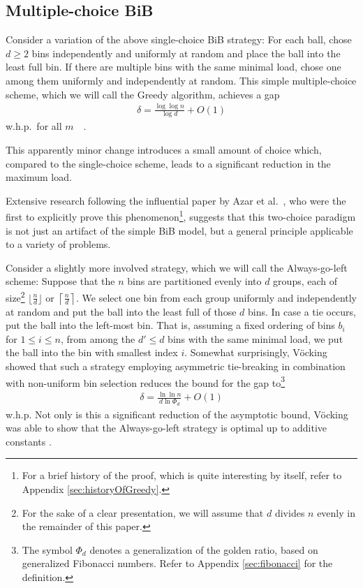 \documentclass[a4paper,12pt]{article}
\begin{document}
\subsection{Multiple-choice BiB}
Consider a variation of the above single-choice BiB strategy: For each ball, chose $d \geq 2$ bins independently and uniformly at random and place the ball into the least full bin. If there are multiple bins with the same minimal load, chose one among them uniformly and independently at random. This simple multiple-choice scheme, which we will call the Greedy algorithm, achieves a gap
\begin{align*}
\delta = \frac{\log \log n}{\log d} + O(1)
\end{align*}
 w.h.p.~for all $m$~\cite{ABKU99}~\cite{BCSV06}.
 
This apparently minor change introduces a small amount of choice which, compared to the single-choice scheme, leads to a significant reduction in the maximum load. 
\begin{comment}
Curiously, the exponential decrease in the gap is already achieved having just two choices (that is, $d=2$). Each additional choice decreases the bound for the maximum gap by just a constant factor~\cite{MRS01}. 
\end{comment}
Extensive research following the influential paper by Azar et al.~\cite{ABKU99}, who were the first to explicitly prove this phenomenon\footnote{For a brief history of the proof, which is quite interesting by itself, refer to Appendix \ref{sec:historyOfGreedy}.}, suggests that this two-choice paradigm is not just an artifact of the simple BiB model, but a general principle applicable to a variety of problems. 

Consider a slightly more involved strategy, which we will call the Always-go-left scheme: Suppose that the $n$ bins are partitioned evenly into $d$ groups, each of size\footnote{For the sake of a clear presentation, we will assume that $d$ divides $n$ evenly in the remainder of this paper.} $\lfloor \frac{n}{d}\rfloor$ or $\left\lceil\frac{n}{d}\right\rceil$. We select one bin from each group uniformly and independently at random and put the ball into the least full of those $d$ bins. In case a tie occurs, put the ball into the left-most bin. That is, assuming a fixed ordering of bins $b_i$ for $1 \leq i \leq n$, from among the $d' \leq d$ bins with the same minimal load, we put the ball into the bin with smallest index $i$. Somewhat surprisingly, V\"ocking \cite{VOC03} showed that such a strategy employing asymmetric tie-breaking in combination with non-uniform bin selection reduces the bound for the gap to\footnote{The symbol $\Phi_d$ denotes a generalization of the golden ratio, based on generalized Fibonacci numbers. Refer to Appendix \ref{sec:fibonacci} for the definition.}
\begin{align*}
\delta = \frac{\ln\ln n}{d  \ln \Phi_d} + O(1)
\end{align*}
w.h.p. Not only is this a significant reduction of the asymptotic bound, V\"ocking was able to show that the Always-go-left strategy is optimal up to additive constants \cite{VOC03}.
\end{document}
